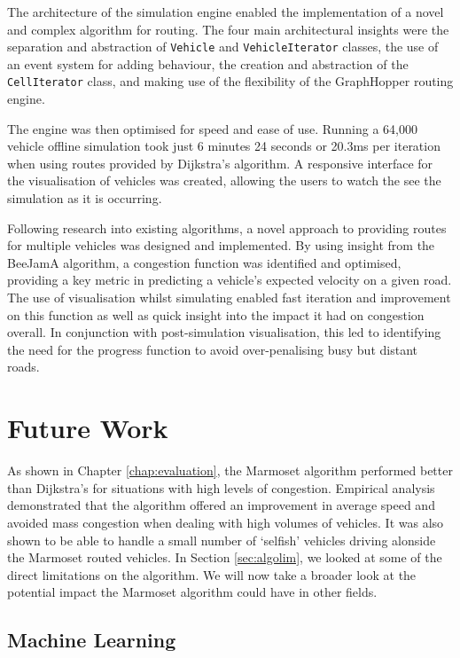 \documentclass[ %
                    author={Alexander Hill},
                supervisor={Dr. Benjamin Sach},
                    degree={MEng},
                     title={MARMOSET},
                  subtitle={Multi-Agent Route Management using Online Simulation for Efficient Transportation},
                      type={research},
                      year={2016} ]{dissertation}
\begin{document}
The architecture of the simulation engine enabled the implementation of a novel
and complex algorithm for routing. The four main architectural insights were the
separation and abstraction of \texttt{Vehicle} and \texttt{VehicleIterator}
classes, the use of an event system for adding behaviour, the creation and
abstraction of the \texttt{CellIterator} class, and making use of the
flexibility of the GraphHopper routing engine.

The engine was then optimised for speed and ease of use. Running a 64,000
vehicle offline simulation took just 6 minutes 24 seconds or 20.3ms per
iteration when using routes provided by Dijkstra's algorithm. A responsive
interface for the visualisation of vehicles was created, allowing the users to
watch the see the simulation as it is occurring.

Following research into existing algorithms, a novel approach to providing
routes for multiple vehicles was designed and implemented. By using insight from
the BeeJamA algorithm, a congestion function was identified and optimised,
providing a key metric in predicting a vehicle's expected velocity on a given
road. The use of visualisation whilst simulating enabled fast iteration and
improvement on this function as well as quick insight into the impact it had on
congestion overall. In conjunction with post-simulation visualisation, this led
to identifying the need for the progress function to avoid over-penalising busy
but distant roads.

\section{Future Work}

As shown in Chapter \ref{chap:evaluation}, the Marmoset algorithm performed
better than Dijkstra's for situations with high levels of congestion. Empirical
analysis demonstrated that the algorithm offered an improvement in average speed
and avoided mass congestion when dealing with high volumes of vehicles. It was
also shown to be able to handle a small number of `selfish' vehicles driving
alonside the Marmoset routed vehicles. In Section \ref{sec:algolim}, we looked
at some of the direct limitations on the algorithm. We will now take a broader
look at the potential impact the Marmoset algorithm could have in other fields.

\subsection*{Machine Learning}
\end{document}
